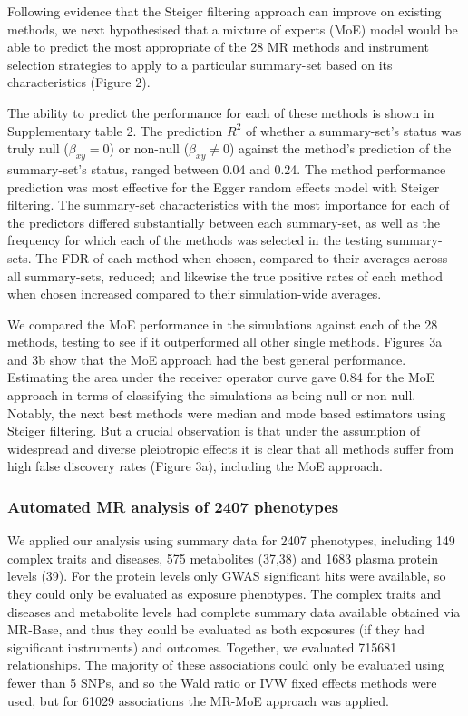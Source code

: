 \documentclass[]{article}
\begin{document}
Following evidence that the Steiger filtering approach can improve on
existing methods, we next hypothesised that a mixture of experts (MoE)
model would be able to predict the most appropriate of the 28 MR methods
and instrument selection strategies to apply to a particular summary-set
based on its characteristics (Figure 2).

The ability to predict the performance for each of these methods is
shown in Supplementary table 2. The prediction \(R^2\) of whether a
summary-set's status was truly null (\(\beta_{xy}=0\)) or non-null
(\(\beta_{xy} \neq 0\)) against the method's prediction of the
summary-set's status, ranged between 0.04 and 0.24. The method
performance prediction was most effective for the Egger random effects
model with Steiger filtering. The summary-set characteristics with the
most importance for each of the predictors differed substantially
between each summary-set, as well as the frequency for which each of the
methods was selected in the testing summary-sets. The FDR of each method
when chosen, compared to their averages across all summary-sets,
reduced; and likewise the true positive rates of each method when chosen
increased compared to their simulation-wide averages.

We compared the MoE performance in the simulations against each of the
28 methods, testing to see if it outperformed all other single methods.
Figures 3a and 3b show that the MoE approach had the best general
performance. Estimating the area under the receiver operator curve gave
0.84 for the MoE approach in terms of classifying the simulations as
being null or non-null. Notably, the next best methods were median and
mode based estimators using Steiger filtering. But a crucial observation
is that under the assumption of widespread and diverse pleiotropic
effects it is clear that all methods suffer from high false discovery
rates (Figure 3a), including the MoE approach.

\subsubsection{Automated MR analysis of 2407
phenotypes}\label{automated-mr-analysis-of-2407-phenotypes}

We applied our analysis using summary data for 2407 phenotypes,
including 149 complex traits and diseases, 575 metabolites (37,38) and
1683 plasma protein levels (39). For the protein levels only GWAS
significant hits were available, so they could only be evaluated as
exposure phenotypes. The complex traits and diseases and metabolite
levels had complete summary data available obtained via MR-Base, and
thus they could be evaluated as both exposures (if they had significant
instruments) and outcomes. Together, we evaluated 715681 relationships.
The majority of these associations could only be evaluated using fewer
than 5 SNPs, and so the Wald ratio or IVW fixed effects methods were
used, but for 61029 associations the MR-MoE approach was applied.
\end{document}
